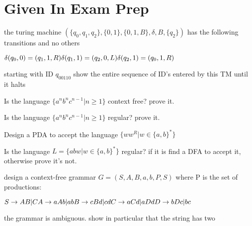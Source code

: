 \documentclass{exam}
\begin{document}
\section*{Given In Exam Prep}
\begin{questions}
  \question
  the turing machine $(\{q_0,q_1,q_2\},\{0,1\},\{0,1,B\},\delta,B,\{q_2\})$ has the following transitions and no others
  \begin{center}
    $
    \delta(q_0,0) = (q_1,1,R)\\
    \delta(q_1,1) = (q_2,0,L)\\
    \delta(q_2,1) = (q_0,1,R)
    $
  \end{center}
  starting with ID $q_00110$ show the entire sequence of ID's entered by this TM until it halts

  \question
  Is the language $\{a^nb^nc^{n-1}| n \ge 1\}$ context free? prove it.

  \question
  Is the language $\{a^{n}b^{n}c^{n-1}| n \ge 1\}$ regular? prove it.

  \question
  Design a PDA to accept the language $\{ww^{R}|w \in \{a,b\}^{*}\}$

  \question
  Is the language $L = \{abw|w \in \{a,b\}^*\}$ regular? if it is find a DFA to accept it, otherwise prove it's not.

  \question
  design a context-free grammar $G = ({S,A,B},{a,b},P,S)$ where P is the set of productions:
  \begin{center}
    $
    S \rightarrow AB|C\\
    A \rightarrow aAb|ab\\
    B \rightarrow cBd|cd\\
    C \rightarrow aCd|aDd\\
    D \rightarrow bDc|bc\\
    $
  \end{center}
  the grammar is ambiguous. show in particular that the string  has two


\end{questions}
\end{document}
